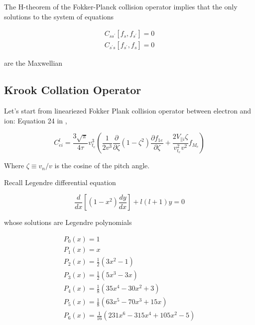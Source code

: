 The H-theorem of the Fokker-Planck collision operator implies that the only solutions
to the system of equations 

\begin{equation}
\begin{array}{l}{C_{s s^{\prime}}\left[f_{s}, f_{s^{\prime}}\right]=0} \\ {C_{s^{\prime} s}\left[f_{s^{\prime}}, f_{s}\right]=0}\end{array}
\end{equation}

are the Maxwellian

\subsection{Krook Collation Operator}

Let's start from lineariezed Fokker Plank collision operator between electron and ion: Equation 24 in \cite{MTM_RH}, 

\begin{equation}
C_{e i}^{l}=\frac{3 \sqrt{\pi}}{4 \tau} v_{t_{e}}^{3}\left(\frac{1}{2 v^{3}} \frac{\partial}{\partial \zeta}\left(1-\zeta^{2}\right) \frac{\partial f_{1 e}}{\partial \zeta}+\frac{2 V_{|| i} \zeta}{v_{t_{e}}^{2} v^{2}} f_{M_{e}}\right)
\label{eq:linear_coll}
\end{equation}

Where $\zeta \equiv v_{n} / v$ is the cosine of the pitch angle. 

Recall Legendre differential equation

\begin{equation}
\frac{d}{d x}\left[\left(1-x^{2}\right) \frac{d y}{d x}\right]+l(l+1) y=0
\label{eq:legendre_diff}
\end{equation}

whose solutions are Legendre polynomials

\begin{equation}
\begin{array}{l}{P_{0}(x)=1} \\ {P_{1}(x)=x} \\ {P_{2}(x)=\frac{1}{2}\left(3 x^{2}-1\right)} \\ {P_{3}(x)=\frac{1}{2}\left(5 x^{3}-3 x\right)} \\ {P_{4}(x)=\frac{1}{8}\left(35 x^{4}-30 x^{2}+3\right)} \\ {P_{5}(x)=\frac{1}{8}\left(63 x^{5}-70 x^{3}+15 x\right)} \\ {P_{6}(x)=\frac{1}{16}\left(231 x^{6}-315 x^{4}+105 x^{2}-5\right)}\end{array}
\label{eq:legendre_poly}
\end{equation}

